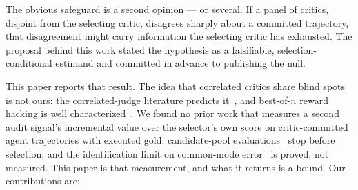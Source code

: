 \documentclass[11pt]{article}
\begin{document}
The obvious safeguard is a second opinion --- or several. If a panel of critics, disjoint from the selecting critic, disagrees sharply about a committed trajectory, that disagreement might carry information the selecting critic has exhausted. The proposal behind this work stated the hypothesis as a falsifiable, selection-conditional estimand and committed in advance to publishing the null.

This paper reports that result. The idea that correlated critics share blind spots is not ours: the correlated-judge literature predicts it~\citep{goel2025great,kim2025correlated,kohli2026nine,hossain2026agreement,afrin2026ensembles}, and best-of-$n$ reward hacking is well characterized~\citep{gao2023scaling,khalaf2025inference,yu2026caution}. We found no prior work that measures a second audit signal's incremental value over the selector's own score on critic-committed agent trajectories with executed gold: candidate-pool evaluations~\citep{shum2025swerm,rahman2026scout} stop before selection, and the identification limit on common-mode error~\citep{afrin2026ensembles} is proved, not measured. This paper is that measurement, and what it returns is a bound. Our contributions are:
\end{document}
